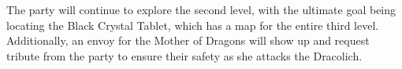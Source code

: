 The party will continue to explore the second level, with the ultimate goal being locating the Black Crystal Tablet, which has a map for the entire third level.
Additionally, an envoy for the Mother of Dragons will show up and request tribute from the party to ensure their safety as she attacks the Dracolich.